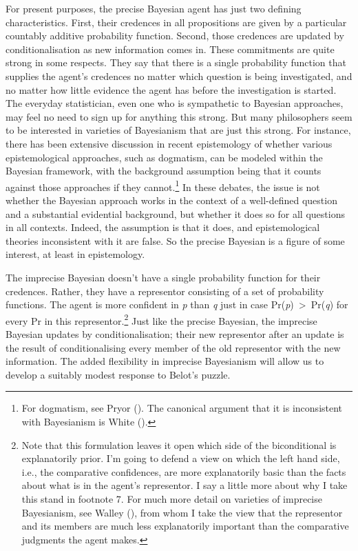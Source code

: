 \documentclass[
  11pt,
  letterpaper,
  DIV=11,
  numbers=noendperiod,
  twoside]{scrartcl}
\begin{document}
For present purposes, the precise Bayesian agent has just two defining
characteristics. First, their credences in all propositions are given by
a particular countably additive probability function. Second, those
credences are updated by conditionalisation as new information comes in.
These commitments are quite strong in some respects. They say that there
is a single probability function that supplies the agent's credences no
matter which question is being investigated, and no matter how little
evidence the agent has before the investigation is started. The everyday
statistician, even one who is sympathetic to Bayesian approaches, may
feel no need to sign up for anything this strong. But many philosophers
seem to be interested in varieties of Bayesianism that are just this
strong. For instance, there has been extensive discussion in recent
epistemology of whether various epistemological approaches, such as
dogmatism, can be modeled within the Bayesian framework, with the
background assumption being that it counts against those approaches if
they cannot.\footnote{For dogmatism, see Pryor
  (). The canonical argument that it is
  inconsistent with Bayesianism is White
  ().} In these debates, the issue is not
whether the Bayesian approach works in the context of a well-defined
question and a substantial evidential background, but whether it does so
for all questions in all contexts. Indeed, the assumption is that it
does, and epistemological theories inconsistent with it are false. So
the precise Bayesian is a figure of some interest, at least in
epistemology.

The imprecise Bayesian doesn't have a single probability function for
their credences. Rather, they have a representor consisting of a set of
probability functions. The agent is more confident in \emph{p} than
\emph{q} just in case Pr(\emph{p})~\textgreater~Pr(\emph{q}) for every
Pr in this representor.\footnote{Note that this formulation leaves it
  open which side of the biconditional is explanatorily prior. I'm going
  to defend a view on which the left hand side, i.e., the comparative
  confidences, are more explanatorily basic than the facts about what is
  in the agent's representor. I say a little more about why I take this
  stand in footnote 7. For much more detail on varieties of imprecise
  Bayesianism, see Walley (), from whom I
  take the view that the representor and its members are much less
  explanatorily important than the comparative judgments the agent
  makes.} Just like the precise Bayesian, the imprecise Bayesian updates
by conditionalisation; their new representor after an update is the
result of conditionalising every member of the old representor with the
new information. The added flexibility in imprecise Bayesianism will
allow us to develop a suitably modest response to Belot's puzzle.
\end{document}
